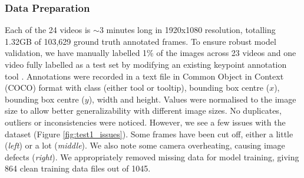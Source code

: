 

\subsubsection{Data Preparation}

Each of the 24 videos is $\sim$3 minutes long in 1920x1080 resolution, totalling 1.32GB of 103,629 ground truth annotated frames. To ensure robust model validation, we have manually labelled 1\% of the images across 23 videos and one video fully labelled as a test set by modifying an existing keypoint annotation tool \cite{herrera_luiscarlosgphkeypoint-annotation-tool_2024}. Annotations were recorded in a text file in Common Object in Context (COCO) format with class (either tool or tooltip), bounding box centre ($x$), bounding box centre ($y$), width and height. Values were normalised to the image size to allow better generalizability with different image sizes. No duplicates, outliers or inconsistencies were noticed. However, we see a few issues with the dataset (Figure \ref{fig:test1_issues}). Some frames have been cut off, either a little (\textit{left}) or a lot (\textit{middle}). We also note some camera overheating, causing image defects (\textit{right}). We appropriately removed missing data for model training, giving 864 clean training data files out of 1045.

